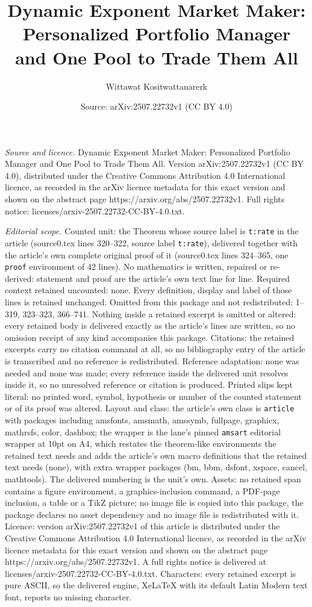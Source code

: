 \documentclass[10pt,a4paper]{amsart}
\title[Dynamic Exponent Market Maker: Personalized Portfolio Manage]{Dynamic Exponent Market Maker: Personalized Portfolio Manager and One Pool to Trade Them All}
\author{Wittawat Kositwattanarerk}
\date{Source: arXiv:2507.22732v1 (CC BY 4.0)}
\begin{document}
\maketitle

\noindent\emph{Source and licence.} Dynamic Exponent Market Maker: Personalized Portfolio Manager and One Pool to Trade Them All. Version arXiv:2507.22732v1 (CC BY 4.0), distributed under the Creative Commons Attribution 4.0 International licence, as recorded in the arXiv licence metadata for this exact version and shown on the abstract page https://arxiv.org/abs/2507.22732v1. Full rights notice: licenses/arxiv-2507.22732-CC-BY-4.0.txt.\par\smallskip

\noindent\textit{Editorial scope.} Counted unit: the Theorem whose source label is \texttt{t:rate} in the article (source0.tex lines 320--322, source label \texttt{t:rate}), delivered together with the article's own complete original proof of it (source0.tex lines 324--365, one \texttt{proof} environment of 42 lines). No mathematics is written, repaired or re-derived: statement and proof are the article's own text line for line. Required context retained uncounted: none. Every definition, display and label of those lines is retained unchanged. Omitted from this package and not redistributed: 1--319, 323--323, 366--741. Nothing inside a retained excerpt is omitted or altered: every retained body is delivered exactly as the article's lines are written, so no omission receipt of any kind accompanies this package. Citations: the retained excerpts carry no citation command at all, so no bibliography entry of the article is transcribed and no reference is redistributed. Reference adaptation: none was needed and none was made; every reference inside the delivered unit resolves inside it, so no unresolved reference or citation is produced. Printed slips kept literal: no printed word, symbol, hypothesis or number of the counted statement or of its proof was altered. Layout and class: the article's own class is \texttt{article} with packages including amsfonts, amsmath, amssymb, fullpage, graphicx, mathrsfs, color, dashbox; the wrapper is the lane's pinned \texttt{amsart} editorial wrapper at 10pt on A4, which restates the theorem-like environments the retained text needs and adds the article's own macro definitions that the retained text needs (none), with extra wrapper packages (bm, bbm, dsfont, xspace, cancel, mathtools). The delivered numbering is the unit's own. Assets: no retained span contains a figure environment, a graphics-inclusion command, a PDF-page inclusion, a table or a TikZ picture; no image file is copied into this package, the package declares no asset dependency and no image file is redistributed with it. Licence: version arXiv:2507.22732v1 of this article is distributed under the Creative Commons Attribution 4.0 International licence, as recorded in the arXiv licence metadata for this exact version and shown on the abstract page https://arxiv.org/abs/2507.22732v1. A full rights notice is delivered at licenses/arxiv-2507.22732-CC-BY-4.0.txt. Characters: every retained excerpt is pure ASCII, so the delivered engine, XeLaTeX with its default Latin Modern text font, reports no missing character.
\end{document}

